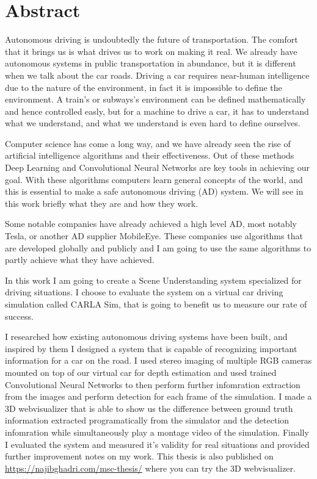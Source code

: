 \setcounter{page}{1}

\selectenglish


\chapter*{Abstract}

Autonomous driving is undoubtedly the future of transportation. The comfort that it brings us is what drives us to work on making it real. We already have autonomous
systems in public transportation in abundance, but it is different when we talk about the car roads. Driving a car requires near-human intelligence
due to the nature of the environment, in fact it is impossible to define the environment. A train's or subways's environment can be defined mathematically and hence controlled
easly, but for a machine to drive a car, it has to understand what we understand, and what we understand is even hard to define ourselves.

Computer science has come a long way, and we have already seen the rise of artificial intelligence algorithms and their effectiveness. Out of these methods Deep Learning and 
Convolutional Neural Networks are key tools in achieving our goal. With these algorithms computers learn general concepts of the world, and this is essential to make a
safe autonomous driving (AD) system. We will see in this work briefly what they are and how they work. 

Some notable companies have already achieved a high level AD, most notably Tesla, or another AD supplier MobileEye. These companies use algorithms that are 
developed globally and publicly and I am going to use the same algorithms to partly achieve what they have achieved. 

In this work I am going to create a Scene Understanding system specialized for driving situations. I choose to evaluate the system on a virtual car driving simulation called 
CARLA Sim, that is going to benefit us to measure our rate of success.

I researched how existing autonomous driving systems have been built, and inspired by them I designed a system that is capable of recognizing important information 
for a car on the road. I used stereo imaging of multiple RGB cameras mounted on top of our virtual car for depth estimation and used trained Convolutional Neural Networks to 
then perform further infomration extraction from the images and perform detection for each frame of the simulation. I made a 3D webvisualizer that is able to show us the difference 
between ground truth information extracted programatically from the simulator and the detection infomration while simultaneously play a montage video of the simulation.
Finally I evaluated the system and measured it's validity for real situations and provided further improvement notes on my work. 
This thesis is also published on \url{https://najibghadri.com/msc-thesis/} where 
you can try the 3D webvisualizer.

\vfill
\selectthesislanguage

\setcounter{romanPage}{\value{page}}
